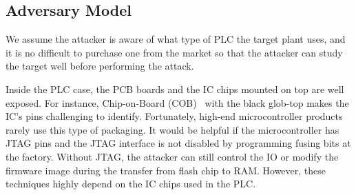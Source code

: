 %
%
%
\subsection{Adversary Model}

We assume the attacker is aware of what type of PLC the target plant uses, and it is no difficult to purchase one from the market so that the attacker can study the target well before performing the attack.

Inside the PLC case, the PCB boards and the IC chips mounted on top are well exposed. For instance, Chip-on-Board (COB)~\cite{lau1994chip} with the black glob-top makes the IC's pins challenging to identify. Fortunately, high-end microcontroller products rarely use this type of packaging. It would be helpful if the microcontroller has JTAG pins and the JTAG interface is not disabled by programming fusing bits at the factory. Without JTAG, the attacker can still control the IO or modify the firmware image during the transfer from flash chip to RAM. However, these techniques highly depend on the IC chips used in the PLC.

